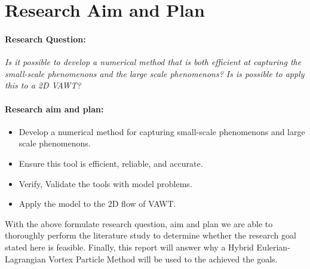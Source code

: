 \section{Research Aim and Plan}

\paragraph*{Research Question:} \textit{Is it possible to develop a numerical method that is both efficient at capturing the small-scale phenomenons and the large scale phenomenons? Is is possible to apply this to a 2D VAWT?}


\paragraph*{Research aim and plan:}
\begin{itemize}
\item Develop a numerical method for capturing small-scale phenomenons and large scale phenomenons.
\item Ensure this tool is efficient, reliable, and accurate.
\item Verify, Validate the tools with model problems.
\item Apply the model to the 2D flow of VAWT.
\end{itemize}

With the above formulate research question, aim and plan we are able to thoroughly perform the literature study to determine whether the research goal stated here is feasible. Finally, this report will answer why a Hybrid Eulerian-Lagrangian Vortex Particle Method will be used to the achieved the goals. 



